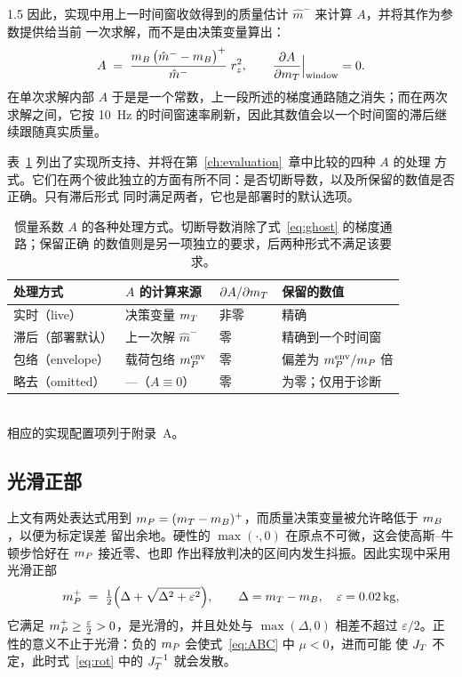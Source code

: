 \begin{spacing}{1.5}
因此，实现中用上一时间窗收敛得到的质量估计 $\hat m^{-}$ 来计算 $A$，并将其作为参数提供给当前
一次求解，而不是由决策变量算出：
\begin{equation}
A \;=\; \frac{m_B\,\bigl(\hat m^{-}-m_B\bigr)^{+}}{\hat m^{-}}\; r_z^2,
\qquad
\frac{\partial A}{\partial m_T}\Big|_{\text{window}} = 0 .
\label{eq:Afrozen}
\end{equation}
在单次求解内部 $A$ 于是是一个常数，上一段所述的梯度通路随之消失；而在两次求解之间，它按
\SI{10}{\hertz} 的时间窗速率刷新，因此其数值会以一个时间窗的滞后继续跟随真实质量。

表~\ref{tab:amode} 列出了实现所支持、并将在第~\ref{ch:evaluation}~章中比较的四种 $A$ 的处理
方式。它们在两个彼此独立的方面有所不同：是否切断导数，以及所保留的数值是否正确。只有滞后形式
同时满足两者，它也是部署时的默认选项。

\begin{table}[ht]
\centering
\caption{惯量系数 $A$ 的各种处理方式。切断导数消除了式~\eqref{eq:ghost} 的梯度通路；保留正确
的数值则是另一项独立的要求，后两种形式不满足该要求。}
\label{tab:amode}
\small
\begin{tabular}{@{}llll@{}}
\toprule
处理方式 & $A$ 的计算来源 & $\partial A/\partial m_T$ & 保留的数值 \\
\midrule
实时（live） & 决策变量 $m_T$ & 非零 & 精确 \\
滞后（部署默认） & 上一次解 $\hat m^{-}$ & 零 & 精确到一个时间窗 \\
包络（envelope） & 载荷包络 $m_P^{\mathrm{env}}$ & 零 & 偏差为 $m_P^{\mathrm{env}}/m_P$ 倍 \\
略去（omitted） & ---（$A\equiv0$） & 零 & 为零；仅用于诊断 \\
\bottomrule
\end{tabular}
\\[4pt]
\footnotesize 相应的实现配置项列于附录~A。
\end{table}

\subsection{光滑正部}\label{sec:model:smoothpos}

上文有两处表达式用到 $m_P=(m_T-m_B)^{+}$，而质量决策变量被允许略低于 $m_B$，以便为标定误差
留出余地。硬性的 $\max(\cdot,0)$ 在原点不可微，这会使高斯--牛顿步恰好在 $m_P$ 接近零、也即
作出释放判决的区间内发生抖振。因此实现中采用光滑正部
\begin{equation}
\mP^{+} \;=\; \tfrac{1}{2}\Bigl(\Delta + \sqrt{\Delta^2+\varepsilon^2}\Bigr),
\qquad \Delta = \mT-\mB, \quad \varepsilon=\SI{0.02}{\kg},
\label{eq:smoothpos}
\end{equation}
它满足 $m_P^{+}\ge \tfrac{\varepsilon}{2}>0$，是光滑的，并且处处与 $\max(\Delta,0)$ 相差不超过
$\varepsilon/2$。正性的意义不止于光滑：负的 $m_P$ 会使式~\eqref{eq:ABC} 中 $\mu<0$，进而可能
使 $J_T$ 不定，此时式~\eqref{eq:rot} 中的 $J_T^{-1}$ 就会发散。


\end{spacing}
